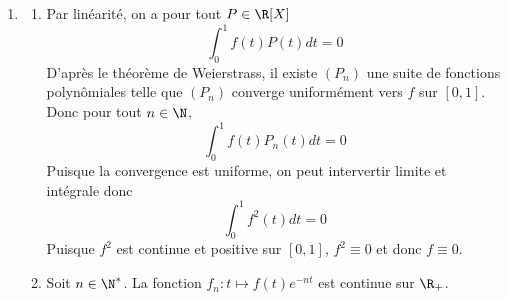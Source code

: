 \documentclass{book}
\begin{document}
\begin{enumerate}[leftmargin=*]
\begin{enumerate}
		Ce prolongement de $f$ appartient à $E$.\\
		En procédant à un changement de variable affine, on se ramène à une fonction nulle en dehors de $[-\frac{1}{2},\frac{1}{2}]$, donc la fonction $f$ est alors limite uniforme de fonctions polynomiales sur $[c,d]$ d'après la question précédente, et en particulier sur $[a,b]$.
	\end{enumerate}
	\item \begin{enumerate}
	\item Par linéarité, on a pour tout $P\in\R[X]$ 
	\[\int_{0}^{1}f(t)P(t)dt=0\]
	D'après le théorème de Weierstrass, il existe $(P_n)$ une suite de fonctions polynômiales telle que $(P_n)$ converge uniformément vers $f$ sur $[0,1]$.\\
	Donc pour tout $n\in\N$,
	\[\int_{0}^{1}f(t)P_n(t)dt=0\]
	Puisque la convergence est uniforme, on peut intervertir limite et intégrale donc 
	\[\int_{0}^{1}f^2(t)dt=0\]	
	Puisque $f^2$ est continue et positive sur $[0,1]$, $f^2\equiv 0$ et donc $f\equiv 0$.
	\item Soit $n\in \N^*$. La fonction $f_n:t\mapsto f(t)e^{-nt}$ est continue sur $\R_+$.
	\end{enumerate}
	\end{enumerate}
	
\end{document}
